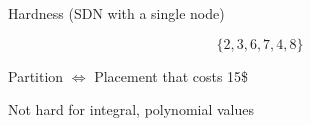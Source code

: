 \begin{frame}{Hardness \small(SDN with a single node)}

\onslide<+->
\onslide<+->
$$
\{2, 3, 6, 7, 4, 8\}
$$
\begin{center}
 
\end{center}
\vfill


\begin{center}
Partition $\iff$ Placement that costs 15\$ 
\end{center}


\onslide<+>
\hfill {\tiny * Not hard for integral, polynomial values}
\end{frame}